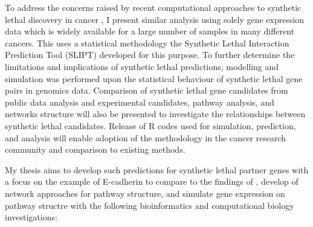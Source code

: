 To address the concerns raised by recent computational approaches to synthetic lethal discovery in cancer \citep{Jerby2014, Lu2015, Wappett2016}, I present similar analysis using solely gene expression data which is widely available for a large number of samples in many different cancers. This uses a statistical methodology the Synthetic Lethal Interaction Prediction Tool (SLIPT) developed for this purpose. To further determine the limitations and implications of synthetic lethal predictions, modelling and simulation was performed upon the statistical behaviour of synthetic lethal gene pairs in genomics data. Comparison of synthetic lethal gene candidates from public data analysis and experimental candidates, pathway analysis, and networks structure will also be presented to investigate the relationships between synthetic lethal candidates. Release of R codes used for simulation, prediction, and analysis will enable adoption of the methodology in the cancer research community and comparison to existing methods. 

My thesis aims to develop such predictions for synthetic lethal partner genes with a focus on the example of E-cadherin to compare to the findings of \citet{Telford2015}, develop of network approaches for pathway structure, and simulate gene expression on pathway structre with the following bioinformatics and computational biology investigations:

